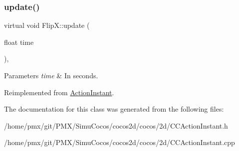 \subsubsection{\texorpdfstring{update()}{update()}\hspace{0.1cm}{\footnotesize\ttfamily [2/2]}}
{\footnotesize\ttfamily virtual void Flip\+X\+::update (\begin{DoxyParamCaption}\item[{float}]{time }\end{DoxyParamCaption})\hspace{0.3cm}{\ttfamily [override]}, {\ttfamily [virtual]}}


\begin{DoxyParams}{Parameters}
{\em time} & In seconds. \\
\hline
\end{DoxyParams}


Reimplemented from \hyperlink{classActionInstant_a59875bf08cd1f58c0c8c6693ac540ade}{Action\+Instant}.



The documentation for this class was generated from the following files\+:\begin{DoxyCompactItemize}
\item 
/home/pmx/git/\+P\+M\+X/\+Simu\+Cocos/cocos2d/cocos/2d/C\+C\+Action\+Instant.\+h\item 
/home/pmx/git/\+P\+M\+X/\+Simu\+Cocos/cocos2d/cocos/2d/C\+C\+Action\+Instant.\+cpp\end{DoxyCompactItemize}
